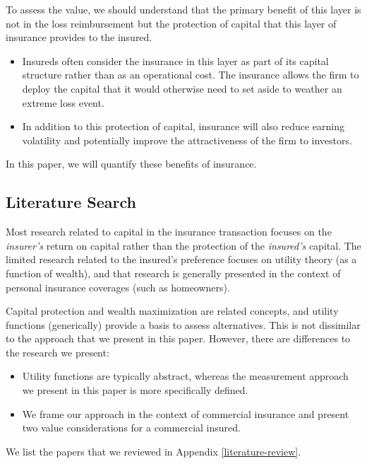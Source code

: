 \documentclass[
]{article}
\begin{document}
To assess the value, we should understand that the primary benefit of
this layer is not in the loss reimbursement but the protection of
capital that this layer of insurance provides to the insured.

\begin{itemize}
\item
  Insureds often consider the insurance in this layer as part of its
  capital structure rather than as an operational cost. The insurance
  allows the firm to deploy the capital that it would otherwise need to
  set aside to weather an extreme loss event.
\item
  In addition to this protection of capital, insurance will also reduce
  earning volatility and potentially improve the attractiveness of the
  firm to investors.
\end{itemize}

In this paper, we will quantify these benefits of insurance.

\hypertarget{literature-search}{%
\subsection{Literature Search}\label{literature-search}}

Most research related to capital in the insurance transaction focuses on
the \emph{insurer's} return on capital rather than the protection of the
\emph{insured's} capital. The limited research related to the insured's
preference focuses on utility theory (as a function of wealth), and that
research is generally presented in the context of personal insurance
coverages (such as homeowners).

Capital protection and wealth maximization are related concepts, and
utility functions (generically) provide a basis to assess alternatives.
This is not dissimilar to the approach that we present in this paper.
However, there are differences to the research we present:

\begin{itemize}
\item
  Utility functions are typically abstract, whereas the measurement
  approach we present in this paper is more specifically defined.
\item
  We frame our approach in the context of commercial insurance and
  present two value considerations for a commercial insured.
\end{itemize}

We list the papers that we reviewed in Appendix \ref{literature-review}.
\end{document}
